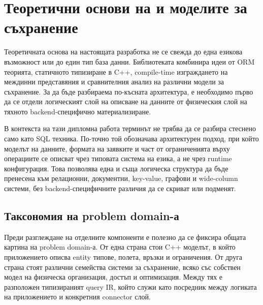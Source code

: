 \section{Теоретични основи на \ORMName{} и моделите за съхранение}
\label{sec:theoretical_background}

Теоретичната основа на настоящата разработка не се свежда до една езикова възможност или до един тип база данни. Библиотеката комбинира идеи от ORM теорията, статичното типизиране в C++, compile-time изграждането на междинни представяния и сравнителния анализ на различни модели за съхранение. За да бъде разбираема по-късната архитектура, е необходимо първо да се отдели логическият слой на описване на данните от физическия слой на тяхното backend-специфично материализиране.

В контекста на тази дипломна работа терминът \ORMName{} не трябва да се разбира стеснено само като SQL техника. По-точно той обозначава архитектурен подход, при който моделът на данните, формата на заявките и част от ограниченията върху операциите се описват чрез типовата система на езика, а не чрез runtime конфигурация. Това позволява една и съща логическа структура да бъде пренесена към релационни, документни, key-value, графови и wide-column системи, без backend-специфичните различия да се скриват или подменят.

\subsection{Таксономия на problem domain-а}

Преди разглеждане на отделните компоненти е полезно да се фиксира общата картина на problem domain-а. От една страна стои C++ моделът, в който приложението описва entity типове, полета, връзки и ограничения. От друга страна стоят различни семейства системи за съхранение, всяко със собствен модел на физическа организация, достъп и оптимизация. Между тях е разположен типизираният query IR, който служи като посредник между логиката на приложението и конкретния connector слой.

